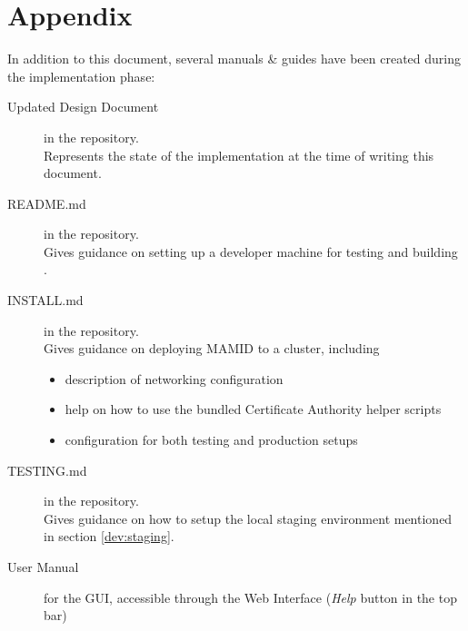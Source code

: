 \section{Appendix}

In addition to this document, several manuals \& guides have been created during the implementation phase:

\begin{description}
\item[Updated Design Document] in the  repository.\\
      Represents the state of the implementation at the time of writing this document.
\item[README.md] in the  repository.\\
      Gives guidance on setting up a developer machine for testing and building \mamid.
\item[INSTALL.md] in the  repository.\\
      Gives guidance on deploying MAMID to a cluster, including 
      \begin{itemize}
        \item description of networking configuration
        \item help on how to use the bundled Certificate Authority helper scripts
        \item configuration for both testing and production setups
      \end{itemize}
\item[TESTING.md] in the  repository.\\
      Gives guidance on how to setup the local staging environment mentioned in section \ref{dev:staging}.
\item[User Manual] for the GUI, accessible through the \mamid Web Interface (\textit{Help} button in the top bar)
\end{description}
